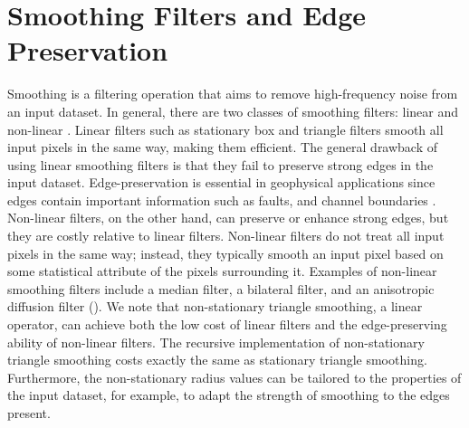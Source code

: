  
\section{Smoothing Filters and Edge Preservation}
Smoothing is a filtering operation that aims to remove high-frequency noise from an input dataset. In general, there are two classes of smoothing filters: linear and non-linear \cite[]{hall2014}. Linear filters such as stationary box and triangle filters smooth all input pixels in the same way, making them efficient. The general drawback of using linear smoothing filters is that they fail to preserve strong edges in the input dataset. Edge-preservation is essential in geophysical applications since edges contain important information such as faults, and channel boundaries \cite[]{bahorichfarmer1995}. Non-linear filters, on the other hand, can preserve or enhance strong edges, but they are costly relative to linear filters. Non-linear filters do not treat all input pixels in the same way; instead, they typically smooth an input pixel based on some statistical attribute of the pixels surrounding it. Examples of non-linear smoothing filters include a median filter, a bilateral filter, and an anisotropic diffusion filter (\citealp{tukey1970,manduchiandtomasi1998,peronamalik1990}). We note that non-stationary triangle smoothing, a linear operator, can achieve both the low cost of linear filters and the edge-preserving ability of non-linear filters. The recursive implementation of non-stationary triangle smoothing costs exactly the same as stationary triangle smoothing. Furthermore, the non-stationary radius values can be tailored to the properties of the input dataset, for example, to adapt the strength of smoothing to the edges present.

